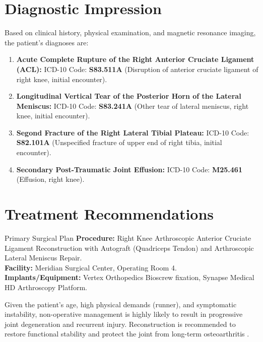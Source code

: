 \section{Diagnostic Impression}
\label{sec:impression}

Based on clinical history, physical examination, and magnetic resonance imaging, the patient's diagnoses are:
\begin{enumerate}
  \item \textbf{Acute Complete Rupture of the Right Anterior Cruciate Ligament (ACL):} ICD-10 Code: \textbf{S83.511A} (Disruption of anterior cruciate ligament of right knee, initial encounter).
  \item \textbf{Longitudinal Vertical Tear of the Posterior Horn of the Lateral Meniscus:} ICD-10 Code: \textbf{S83.241A} (Other tear of lateral meniscus, right knee, initial encounter).
  \item \textbf{Segond Fracture of the Right Lateral Tibial Plateau:} ICD-10 Code: \textbf{S82.101A} (Unspecified fracture of upper end of right tibia, initial encounter).
  \item \textbf{Secondary Post-Traumatic Joint Effusion:} ICD-10 Code: \textbf{M25.461} (Effusion, right knee).
\end{enumerate}

\section{Treatment Recommendations}
\label{sec:recommendations}

\begin{recommendationbox}{Primary Surgical Plan}
  \textbf{Procedure:} Right Knee Arthroscopic Anterior Cruciate Ligament Reconstruction with Autograft (Quadriceps Tendon) and Arthroscopic Lateral Meniscus Repair. \\
  \textbf{Facility:} Meridian Surgical Center, Operating Room 4. \\
  \textbf{Implants/Equipment:} Vertex Orthopedics Bioscrew fixation, Synapse Medical HD Arthroscopy Platform.
\end{recommendationbox}

Given the patient's age, high physical demands (runner), and symptomatic instability, non-operative management is highly likely to result in progressive joint degeneration and recurrent injury. Reconstruction is recommended to restore functional stability and protect the joint from long-term osteoarthritis \cite{shea2022acl}.

